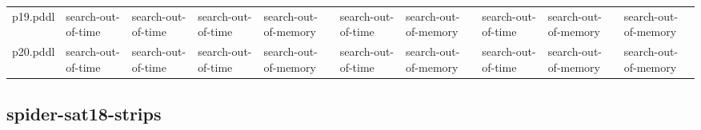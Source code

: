 \documentclass{article}
\begin{document}
\begin{tabular}{@{}lrrrrrrrrr@{}}
p19.pddl & \multicolumn{1}{|l|}{search-out-of-time} & \multicolumn{1}{|l|}{search-out-of-time} & \multicolumn{1}{|l|}{search-out-of-time} & \multicolumn{1}{|l|}{search-out-of-memory} & \multicolumn{1}{|l|}{search-out-of-time} & \multicolumn{1}{|l|}{search-out-of-memory} & \multicolumn{1}{|l|}{search-out-of-time} & \multicolumn{1}{|l|}{search-out-of-memory} & \multicolumn{1}{|l|}{search-out-of-memory} \\
p20.pddl & \multicolumn{1}{|l|}{search-out-of-time} & \multicolumn{1}{|l|}{search-out-of-time} & \multicolumn{1}{|l|}{search-out-of-time} & \multicolumn{1}{|l|}{search-out-of-memory} & \multicolumn{1}{|l|}{search-out-of-time} & \multicolumn{1}{|l|}{search-out-of-memory} & \multicolumn{1}{|l|}{search-out-of-time} & \multicolumn{1}{|l|}{search-out-of-memory} & \multicolumn{1}{|l|}{search-out-of-memory} \\
\end{tabular}

\hypertarget{error-spider-sat18-strips}{}
\subsection*{spider-sat18-strips}
\end{document}
